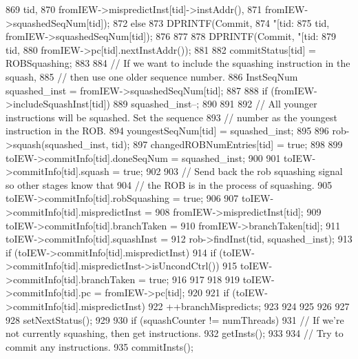 \begin{DoxyCode}
{{{{869                     tid,
870                     fromIEW->mispredictInst[tid]->instAddr(),
871                     fromIEW->squashedSeqNum[tid]);
872             } else {
873                 DPRINTF(Commit,
874                     "[tid:%
875                     tid, fromIEW->squashedSeqNum[tid]);
876             }
877 
878             DPRINTF(Commit, "[tid:%
879                     tid,
880                     fromIEW->pc[tid].nextInstAddr());
881 
882             commitStatus[tid] = ROBSquashing;
883 
884             // If we want to include the squashing instruction in the squash,
885             // then use one older sequence number.
886             InstSeqNum squashed_inst = fromIEW->squashedSeqNum[tid];
887 
888             if (fromIEW->includeSquashInst[tid]) {
889                 squashed_inst--;
890             }
891 
892             // All younger instructions will be squashed. Set the sequence
893             // number as the youngest instruction in the ROB.
894             youngestSeqNum[tid] = squashed_inst;
895 
896             rob->squash(squashed_inst, tid);
897             changedROBNumEntries[tid] = true;
898 
899             toIEW->commitInfo[tid].doneSeqNum = squashed_inst;
900 
901             toIEW->commitInfo[tid].squash = true;
902 
903             // Send back the rob squashing signal so other stages know that
904             // the ROB is in the process of squashing.
905             toIEW->commitInfo[tid].robSquashing = true;
906 
907             toIEW->commitInfo[tid].mispredictInst =
908                 fromIEW->mispredictInst[tid];
909             toIEW->commitInfo[tid].branchTaken =
910                 fromIEW->branchTaken[tid];
911             toIEW->commitInfo[tid].squashInst =
912                                     rob->findInst(tid, squashed_inst);
913             if (toIEW->commitInfo[tid].mispredictInst) {
914                 if (toIEW->commitInfo[tid].mispredictInst->isUncondCtrl()) {
915                      toIEW->commitInfo[tid].branchTaken = true;
916                 }
917             }
918 
919             toIEW->commitInfo[tid].pc = fromIEW->pc[tid];
920 
921             if (toIEW->commitInfo[tid].mispredictInst) {
922                 ++branchMispredicts;
923             }
924         }
925 
926     }
927 
928     setNextStatus();
929 
930     if (squashCounter != numThreads) {
931         // If we're not currently squashing, then get instructions.
932         getInsts();
933 
934         // Try to commit any instructions.
935         commitInsts();
}}
\end{DoxyCode}
